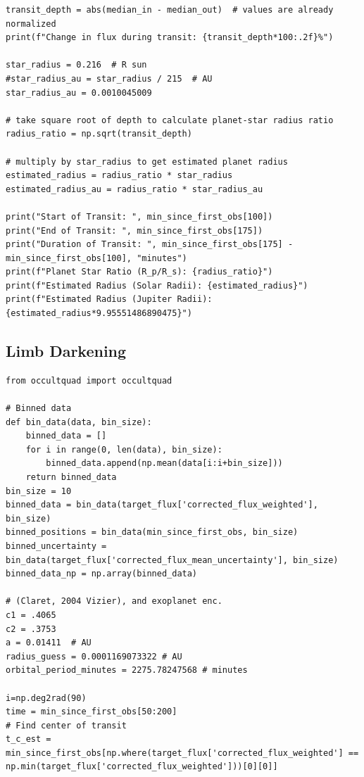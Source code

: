 \documentclass{article}
\begin{document}
\begin{appendices}
\begin{scriptsize}
\begin{verbatim}
transit_depth = abs(median_in - median_out)  # values are already normalized
print(f"Change in flux during transit: {transit_depth*100:.2f}%")

star_radius = 0.216  # R sun
#star_radius_au = star_radius / 215  # AU
star_radius_au = 0.0010045009

# take square root of depth to calculate planet-star radius ratio
radius_ratio = np.sqrt(transit_depth) 

# multiply by star_radius to get estimated planet radius
estimated_radius = radius_ratio * star_radius
estimated_radius_au = radius_ratio * star_radius_au

print("Start of Transit: ", min_since_first_obs[100])
print("End of Transit: ", min_since_first_obs[175])
print("Duration of Transit: ", min_since_first_obs[175] - min_since_first_obs[100], "minutes")
print(f"Planet Star Ratio (R_p/R_s): {radius_ratio}")
print(f"Estimated Radius (Solar Radii): {estimated_radius}")
print(f"Estimated Radius (Jupiter Radii): {estimated_radius*9.95551486890475}")

\end{verbatim}
\end{scriptsize}


\subsection{Limb Darkening}
\begin{scriptsize}
\begin{verbatim}
from occultquad import occultquad

# Binned data
def bin_data(data, bin_size):
    binned_data = []
    for i in range(0, len(data), bin_size):
        binned_data.append(np.mean(data[i:i+bin_size]))
    return binned_data
bin_size = 10
binned_data = bin_data(target_flux['corrected_flux_weighted'], bin_size)
binned_positions = bin_data(min_since_first_obs, bin_size)
binned_uncertainty = bin_data(target_flux['corrected_flux_mean_uncertainty'], bin_size)
binned_data_np = np.array(binned_data)

# (Claret, 2004 Vizier), and exoplanet enc. 
c1 = .4065
c2 = .3753	
a = 0.01411  # AU
radius_guess = 0.0001169073322 # AU
orbital_period_minutes = 2275.78247568 # minutes

i=np.deg2rad(90)
time = min_since_first_obs[50:200]
# Find center of transit 
t_c_est = min_since_first_obs[np.where(target_flux['corrected_flux_weighted'] == np.min(target_flux['corrected_flux_weighted']))[0][0]]


\end{verbatim}
\end{scriptsize}
\end{appendices}
\end{document}
